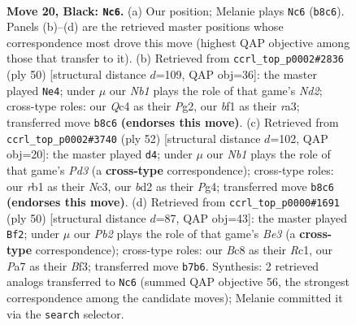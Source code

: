 \documentclass[11pt]{article}
\begin{document}
\clearpage

\begin{figure}[p]\centering
\begin{subfigure}{0.46\textwidth}\centering
\resizebox{\linewidth}{!}{%
\newchessgame
\chessboard[
  setfen={rnb1k3/pp6/6p1/4b1P1/2q5/3p4/3B2K1/1R1Q1BN1 b q - 3 20},
  showmover=false,
  pgfstyle=straightmove, color=movearrow, markmove={b8-c6}
]}
\caption{}
\end{subfigure}\hfill
\begin{subfigure}{0.46\textwidth}\centering
\resizebox{\linewidth}{!}{%
\newchessgame
\chessboard[
  setfen={5k2/p5b1/6pp/3B1b2/8/r1P4P/3N1PP1/3R2K1 w - - 1 26},
  showmover=false,
  pgfstyle=straightmove, color=movearrow, markmove={d2-e4}
]}
\caption{}
\end{subfigure}
\\[4pt]
\begin{subfigure}{0.46\textwidth}\centering
\resizebox{\linewidth}{!}{%
\newchessgame
\chessboard[
  setfen={4r1k1/3q4/p1bb3p/3pB3/6P1/2NPQ2P/1P6/5RK1 w - - 1 27},
  showmover=false,
  pgfstyle=straightmove, color=movearrow, markmove={d3-d4}
]}
\caption{}
\end{subfigure}\hfill
\begin{subfigure}{0.46\textwidth}\centering
\resizebox{\linewidth}{!}{%
\newchessgame
\chessboard[
  setfen={r5k1/1b2qppp/3b4/3P4/5P2/3QBBP1/7P/2R3K1 w - - 1 26},
  showmover=false,
  pgfstyle=straightmove, color=movearrow, markmove={e3-f2}
]}
\caption{}
\end{subfigure}
\caption{\textbf{Move 20, Black: \texttt{Nc6}.} (a) Our position; Melanie plays \texttt{Nc6} (\texttt{b8c6}). Panels (b)--(d) are the retrieved master positions whose correspondence most drove this move (highest QAP objective among those that transfer to it). (b) Retrieved from \texttt{ccrl\_top\_p0002\#2836} (ply 50) [structural distance $d$=109, QAP obj=36]: the master played \texttt{Ne4}; under $\mu$ our \emph{Nb1} plays the role of that game's \emph{Nd2}; cross-type roles: our \emph{Q}c4 as their \emph{P}g2, our \emph{b}f1 as their \emph{r}a3; transferred move \texttt{b8c6} \textbf{(endorses this move)}. (c) Retrieved from \texttt{ccrl\_top\_p0002\#3740} (ply 52) [structural distance $d$=102, QAP obj=20]: the master played \texttt{d4}; under $\mu$ our \emph{Nb1} plays the role of that game's \emph{Pd3} (a \textbf{cross-type} correspondence); cross-type roles: our \emph{r}b1 as their \emph{N}c3, our \emph{b}d2 as their \emph{P}g4; transferred move \texttt{b8c6} \textbf{(endorses this move)}. (d) Retrieved from \texttt{ccrl\_top\_p0000\#1691} (ply 50) [structural distance $d$=87, QAP obj=43]: the master played \texttt{Bf2}; under $\mu$ our \emph{Pb2} plays the role of that game's \emph{Be3} (a \textbf{cross-type} correspondence); cross-type roles: our \emph{B}c8 as their \emph{R}c1, our \emph{P}a7 as their \emph{B}f3; transferred move \texttt{b7b6}. Synthesis: 2 retrieved analogs transferred to \texttt{Nc6} (summed QAP objective 56, the strongest correspondence among the candidate moves); Melanie committed it via the \texttt{search} selector.}
\label{fig:thought-m39}
\end{figure}
\end{document}
